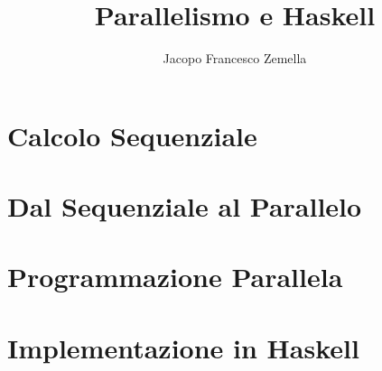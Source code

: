 \documentclass[oneside, 12pt, a4paper]{book}
\author{Jacopo Francesco Zemella}
\title{Parallelismo e Haskell}
\begin{document}
\maketitle

\frontmatter
\pagestyle{plain}




\mainmatter
\pagestyle{plain}

\tableofcontents
\part{Calcolo Sequenziale}





\part{Dal Sequenziale al Parallelo}




\part{Programmazione Parallela}




\part{Implementazione in Haskell}


\printbibliography[title=Bibliografia]
\end{document}
